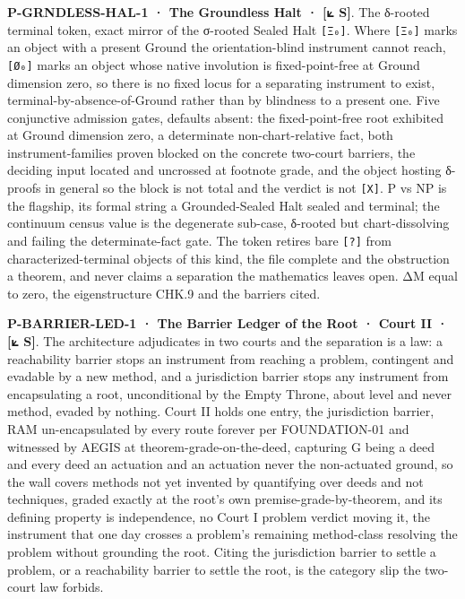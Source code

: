 \documentclass[10pt,twocolumn]{article}
\begin{document}
\textbf{P-GRNDLESS-HAL-1 · The Groundless Halt · {[}⟀ S{]}}. The
δ-rooted terminal token, exact mirror of the σ-rooted Sealed Halt
\texttt{{[}Ξ₀{]}}. Where \texttt{{[}Ξ₀{]}} marks an object with a
present Ground the orientation-blind instrument cannot reach,
\texttt{{[}Ø₀{]}} marks an object whose native involution is
fixed-point-free at Ground dimension zero, so there is no fixed locus
for a separating instrument to exist, terminal-by-absence-of-Ground
rather than by blindness to a present one. Five conjunctive admission
gates, defaults absent: the fixed-point-free root exhibited at Ground
dimension zero, a determinate non-chart-relative fact, both
instrument-families proven blocked on the concrete two-court barriers,
the deciding input located and uncrossed at footnote grade, and the
object hosting δ-proofs in general so the block is not total and the
verdict is not \texttt{{[}X{]}}. P vs NP is the flagship, its formal
string a Grounded-Sealed Halt sealed and terminal; the continuum census
value is the degenerate sub-case, δ-rooted but chart-dissolving and
failing the determinate-fact gate. The token retires bare
\texttt{{[}?{]}} from characterized-terminal objects of this kind, the
file complete and the obstruction a theorem, and never claims a
separation the mathematics leaves open. ΔM equal to zero, the
eigenstructure CHK.9 and the barriers cited.

\textbf{P-BARRIER-LED-1 · The Barrier Ledger of the Root · Court II ·
{[}⟀ S{]}}. The architecture adjudicates in two courts and the
separation is a law: a reachability barrier stops an instrument from
reaching a problem, contingent and evadable by a new method, and a
jurisdiction barrier stops any instrument from encapsulating a root,
unconditional by the Empty Throne, about level and never method, evaded
by nothing. Court II holds one entry, the jurisdiction barrier, RAM
un-encapsulated by every route forever per FOUNDATION-01 and witnessed
by AEGIS at theorem-grade-on-the-deed, capturing G being a deed and
every deed an actuation and an actuation never the non-actuated ground,
so the wall covers methods not yet invented by quantifying over deeds
and not techniques, graded exactly at the root's own
premise-grade-by-theorem, and its defining property is independence, no
Court I problem verdict moving it, the instrument that one day crosses a
problem's remaining method-class resolving the problem without grounding
the root. Citing the jurisdiction barrier to settle a problem, or a
reachability barrier to settle the root, is the category slip the
two-court law forbids.
\end{document}
